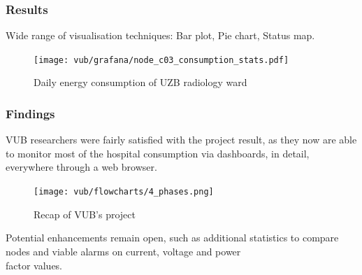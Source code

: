 \begin{frame}
    \frametitle{Results}
    \vspace*{\fill}
    Wide range of visualisation techniques: Bar plot, Pie chart, Status map.

    \begin{figure}
        \texttt{[image: vub/grafana/node\_c03\_consumption\_stats.pdf]}
        \caption{Daily energy consumption of \acs{UZB} radiology ward}
    \end{figure}
    \vspace*{\fill}
\end{frame}

\begin{frame}
    \frametitle{Findings}
    \vspace*{\fill}
    
    VUB researchers were fairly satisfied with
    the project result, as they now are able to monitor most of the hospital
    consumption via dashboards, in detail, everywhere through a web browser.
    \begin{figure}[ht]
        \texttt{[image: vub/flowcharts/4\_phases.png]}
        \caption{Recap of \acs{VUB}'s project}
    \end{figure}
    Potential enhancements remain open, such as additional statistics
    to compare nodes and viable alarms on current, voltage and power \\
    factor values.

    \vspace*{\fill}
\end{frame}